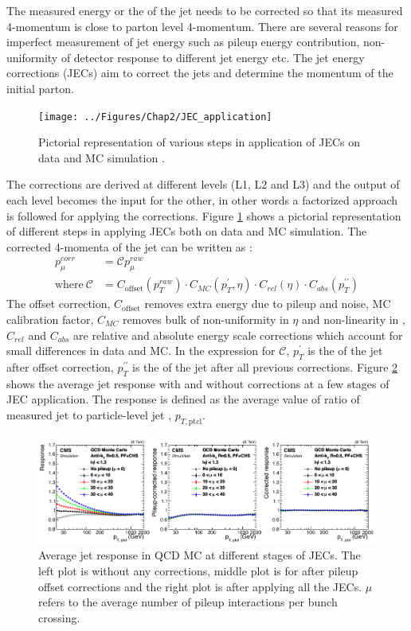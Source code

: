 The measured energy or the \pt of the jet needs to be corrected so that its measured 4-momentum is close to parton level 4-momentum. There are several reasons for imperfect measurement of jet energy such as pileup energy contribution, non-uniformity of detector response to different jet energy etc. The jet energy corrections (JECs) aim to correct the jets and determine the momentum of the initial parton.
\begin{figure}[h!]
\centering
\texttt{[image: ../Figures/Chap2/JEC\_application]}
\captionsetup{width=.95\linewidth}
\caption[Application of JEC]{Pictorial representation of various steps in application of JECs on data and MC simulation \cite{Khachatryan:2016kdb}.}
\label{fig:JEC_application}
\end{figure}
The corrections are derived at different levels (L1, L2 and L3) and the output of each level becomes the input for the other, in other words a factorized approach is followed for applying the corrections. Figure \ref{fig:JEC_application} shows a pictorial representation of different steps in applying JECs both on data and MC simulation. The corrected 4-momenta of the jet can be written as \cite{Chatrchyan:2011ds}:
\begin{align}
p_{\mu}^{corr} &= \mathcal{C}p_{\mu}^{raw}\\
\mathrm{where\ }\mathcal{C} &=C_{\mathrm{offset}}(p_{T}^{raw})\cdot C_{MC}(p_{T}^{\prime},\eta) \cdot C_{rel}(\eta) \cdot C_{abs}(p_{T}^{\prime\prime})
\end{align}
The offset correction, $C_{\mathrm{offset}}$ removes extra energy due to pileup and noise, MC calibration factor, $C_{MC}$ removes bulk of non-uniformity in $\eta$ and non-linearity in \pt, $C_{rel}$ and $C_{abs}$ are relative and absolute energy scale corrections which account for small differences in data and MC. In the expression for $\mathcal{C}$, $p_{T}^{\prime}$ is the \pt of the jet after offset correction, $p_{T}^{\prime\prime}$ is the \pt of the jet after all previous corrections. Figure \ref{fig:JetResp_JECs} shows the average jet \pt response with and without corrections at a few stages of JEC application. The \pt response is defined as the average value of ratio of measured jet \pt to particle-level jet \pt, $p_{T,\mathrm{ptcl}}$.
\begin{figure}[h!]
\centering
\includegraphics[width=0.95\linewidth]{../Figures/Chap2/JetResp_JECs}
\captionsetup{width=.98\linewidth}
\caption[Jet \pt response with and w/o corrections]{Average jet \pt response in QCD MC at different stages of JECs. The left plot is without any corrections, middle plot is for after pileup offset corrections and the right plot is after applying all the JECs. $\mu$ refers to the average number of pileup interactions per bunch crossing.}
\label{fig:JetResp_JECs}
\end{figure}

